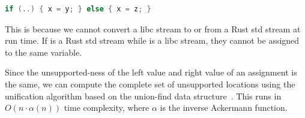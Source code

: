 \begin{lstlisting}[language=C]
if (..) { x = y; } else { x = z; }
\end{lstlisting}

\noindent
%
This is because we cannot convert a libc stream to or from a Rust std stream at
run time.
%
If  is a Rust std stream while  is a libc stream, they cannot be
assigned to the same variable.

Since the unsupported-ness of the left value and right value of an assignment is
the same, we can compute the complete set of unsupported locations using the
unification algorithm based on the union-find data
structure~\cite{galler1964improved}.
%
This runs in $O(n \cdot \alpha(n))$ time complexity, where $\alpha$ is the
inverse Ackermann function.
